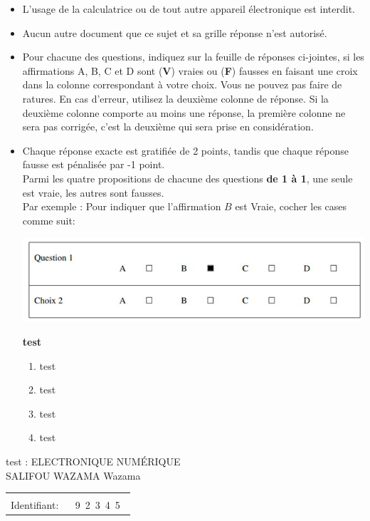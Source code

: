 \documentclass{book}%
\begin{document}
\begin{itemize}%
\item%
L'usage de la calculatrice ou de tout autre appareil électronique est interdit.%
\item%
Aucun autre document que ce sujet et sa grille réponse n'est autorisé.%
\item%
Pour chacune des questions, indiquez sur la feuille de réponses ci-jointes, si les affirmations A, B, C et D sont (\textbf{V}) vraies ou (\textbf{F}) fausses en faisant une croix dans la colonne correspondant à votre choix. Vous ne pouvez pas faire de ratures. En cas d'erreur, utilisez la deuxième colonne de réponse. Si la deuxième colonne comporte au moins une réponse, la première colonne ne sera pas corrigée, c'est la deuxième qui sera prise en considération.%
\item%
Chaque réponse exacte est gratifiée de 2 points, tandis que chaque réponse fausse est pénalisée par -1 point. \\ 	Parmi les quatre propositions de chacune des questions \textbf{de 1 à 1}, une seule est vraie, les autres sont fausses. \\ 	Par exemple : Pour indiquer que l'affirmation $B$ est Vraie, cocher les cases comme suit:  \\ \begin{center}	\includegraphics[scale=0.8]{reponses.png} \end{center}%
\thispagestyle{empty}%
\begin{exercise}%
\textbf{test }%
\begin{enumerate}[label=\textbf{\Alph*. }]%
\item%
test%
\item%
test%
\item%
test%
\item%
test%
\end{enumerate}%
\end{exercise}%
\end{itemize}%
\newpage%
\thispagestyle{empty}%
test : ELECTRONIQUE NUMÉRIQUE $\qquad \qquad \qquad \qquad \qquad \qquad \qquad \qquad$ SALIFOU WAZAMA Wazama %
\begin{flushright}%
\begin{tabular}{|l|}%
\hline%
 \\%
\thispagestyle{empty}%
Identifiant: $\quad$ {\Large 9~2~3~4~5~}%
 \\%
\hline%
\end{tabular}%
\end{flushright}%
\end{document}

